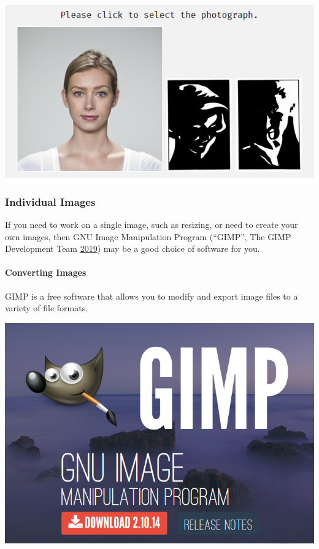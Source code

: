 \documentclass[]{book}
\let\oldparagraph\paragraph
\renewcommand{\paragraph}[1]{\oldparagraph{#1}\mbox{}}
\begin{document}
\includegraphics{images/screenshots/not_pre_processed.png}

\subsubsection{Individual Images}\label{individual-images}

If you need to work on a single image, such as resizing, or need to
create your own images, then GNU Image Manipulation Program (``GIMP'',
The GIMP Development Team \protect\hyperlink{ref-gimp}{2019}) may be a
good choice of software for you.

\paragraph{Converting Images}\label{converting-images}

GIMP is a free software that allows you to modify and export image files
to a variety of file formats.

\includegraphics{images/screenshots/gimp.png}
\end{document}
